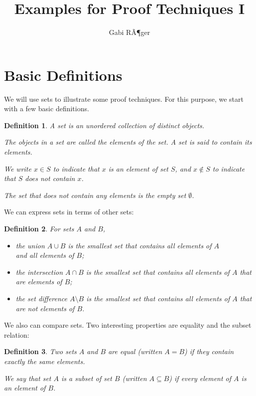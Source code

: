 \documentclass{article}
\title{Examples for Proof Techniques I}
\author{Gabi RÃ¶ger}
\date{}
\newtheorem{definition}{Definition}
\begin{document}
\maketitle

\section{Basic Definitions}
We will use sets to illustrate some proof techniques. For this purpose, we start with a few basic definitions.

\begin{definition}

A \emph{set} is an unordered collection of distinct objects.
\smallskip

The objects in a set are called the \emph{elements} of the set. A set is said
to \emph{contain} its elements.\smallskip

We write $x\in S$ to indicate that $x$ is an element of set $S$, and $x\notin
S$ to indicate that $S$ does not contain $x$.
\smallskip

The set that does not contain any elements is the \emph{empty set} $\emptyset$.
\end{definition}

We can express sets in terms of other sets:

\begin{definition}
For sets $A$ and $B$,
\begin{itemize}
  \item the \emph{union} $A\cup B$ is the smallest set that contains all
    elements of $A$\\and all elements of $B$;
  \item the \emph{intersection} $A\cap B$ is the smallest set that contains all
    elements of $A$ that are elements of $B$;
  \item the \emph{set difference} $A\setminus B$ is the smallest set that
    contains all elements of $A$ that are \emph{not} elements of $B$.
\end{itemize}
\end{definition}

We also can compare sets. Two interesting properties are equality and the subset relation:

\begin{definition}
Two sets $A$ and $B$ are \emph{equal} (written $A = B$) if they contain exactly
the same elements.
\medskip

We say that set $A$ is a \emph{subset} of set $B$ (written $A\subseteq B$) if
every element of $A$ is an element of $B$.
\end{definition}
\end{document}
